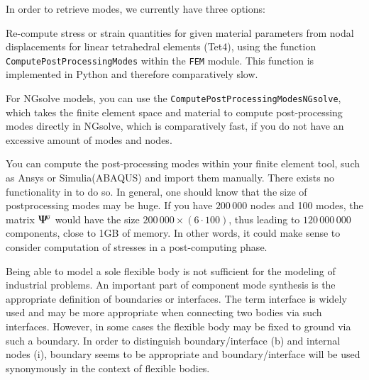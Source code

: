 In order to retrieve modes, we currently have three options:
\bi
  \item Re-compute stress or strain quantities for given material parameters from nodal displacements for linear tetrahedral elements (Tet4), using the function \texttt{ComputePostProcessingModes} within the \texttt{FEM} module. This function is implemented in Python and therefore comparatively slow.
  \item For NGsolve models, you can use the \texttt{ComputePostProcessingModesNGsolve}, which takes the finite element space and material to compute post-processing modes directly in NGsolve, which is comparatively fast, if you do not have an excessive amount of modes and nodes.
  \item You can compute the post-processing modes within your finite element tool, such as Ansys or Simulia(ABAQUS) and import them manually. There exists no functionality in \codeName to do so.
\ei
In general, one should know that the size of postprocessing modes may be huge. If you have $200\,000$ nodes and 100 modes, the matrix $\mbox{\boldmath $\Psi$ \unboldmath}\!\!^{\sigma}$ would have the size $200\,000 \times (6 \cdot 100)$, thus leading to $120\,000\,000$ components, close to 1GB of memory. In other words, it could make sense to consider computation of stresses in a post-computing phase.

Being able to model a sole flexible body is not sufficient for the modeling of industrial problems.
An important part of component mode synthesis is the appropriate definition of boundaries or interfaces.
The term interface is widely used and may be more appropriate when connecting two bodies via such interfaces.
However, in some cases the flexible body may be fixed to ground via such a boundary. In order to distinguish boundary/interface (b) and internal nodes (i), boundary seems to be appropriate and boundary/interface will be used synonymously in the context of flexible bodies.

